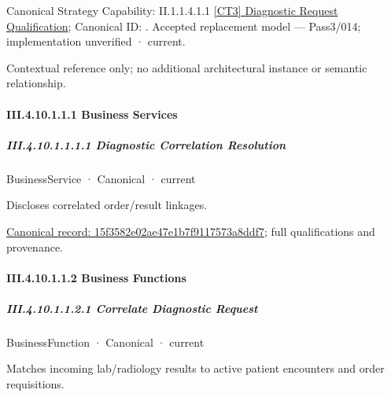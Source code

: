 {\small Canonical Strategy Capability: II.1.1.4.1.1 \hyperref[element:aa18023812014178b3c49df16bf39e5c]{[CT3] Diagnostic Request Qualification}; Canonical ID: \texttt{}. Accepted replacement model — Pass3/014; implementation unverified · current.}\par
Contextual reference only; no additional architectural instance or semantic relationship.\par
\paragraph*{III.4.10.1.1.1 Business Services}
\label{navigation:III.4.10.1.1.1}

\subparagraph*{III.4.10.1.1.1.1 Diagnostic Correlation Resolution}
\label{navigation:III.4.10.1.1.1.1}

\label{element:15f3582e02ae47e1b7f9117573a8ddf7}
{\small BusinessService · Canonical · current}\par

Discloses correlated order/result linkages.


{\footnotesize \href{../../../../../../../continuum/business/business-service/15f3582e02ae47e1b7f9117573a8ddf7.md}{Canonical record: 15f3582e02ae47e1b7f9117573a8ddf7}; full qualifications and provenance.}\par
\paragraph*{III.4.10.1.1.2 Business Functions}
\label{navigation:III.4.10.1.1.2}

\subparagraph*{III.4.10.1.1.2.1 Correlate Diagnostic Request}
\label{navigation:III.4.10.1.1.2.1}

\label{element:6797819b02e0405c8169fa57544d9606}
{\small BusinessFunction · Canonical · current}\par

Matches incoming lab/radiology results to active patient encounters and order requisitions.


